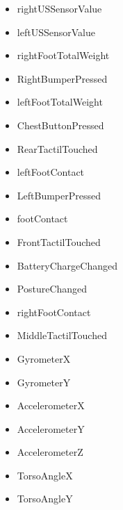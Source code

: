 \begin{itemize}
\item {} 
rightUSSensorValue

\item {} 
leftUSSensorValue

\item {} 
rightFootTotalWeight

\item {} 
RightBumperPressed

\item {} 
leftFootTotalWeight

\item {} 
ChestButtonPressed

\item {} 
RearTactilTouched

\item {} 
leftFootContact

\item {} 
LeftBumperPressed

\item {} 
footContact

\item {} 
FrontTactilTouched

\item {} 
BatteryChargeChanged

\item {} 
PostureChanged

\item {} 
rightFootContact

\item {} 
MiddleTactilTouched

\item {} 
GyrometerX

\item {} 
GyrometerY

\item {} 
AccelerometerX

\item {} 
AccelerometerY

\item {} 
AccelerometerZ

\item {} 
TorsoAngleX

\item {} 
TorsoAngleY

\end{itemize}


